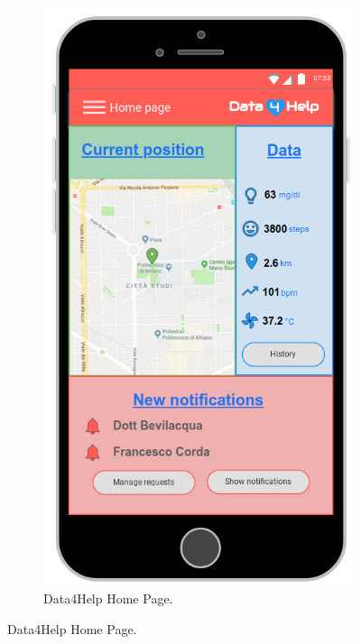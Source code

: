 \begin{figure}[ht]
\begin{subfigure}[t]{0.38\linewidth}
        \includegraphics[width=\linewidth]{images/Mockup/Home_page.png}
        \caption{Data4Help Home Page.}
    \end{subfigure}
    

\end{figure}

